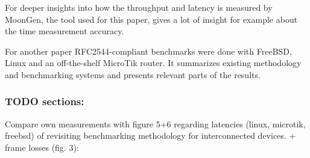 

For deeper insights into how the throughput and latency is measured by
MoonGen, the tool used for this paper, \cite{emmerich2015moongen}
gives a lot of insight for example about the time measurement
accuracy.



For another paper \cite{revisiting-benchmarking:1} RFC2544-compliant
benchmarks were done with FreeBSD, Linux and an off-the-shelf MicroTik
router. It summarizes existing methodology and benchmarking systems
and presents relevant parts of the results.

\subsubsection{TODO sections:}

Compare own measurements with figure 5+6 regarding latencies (linux, microtik, freebsd) of revisiting benchmarking methodology for interconnected devices.
+ frame losses (fig. 3):